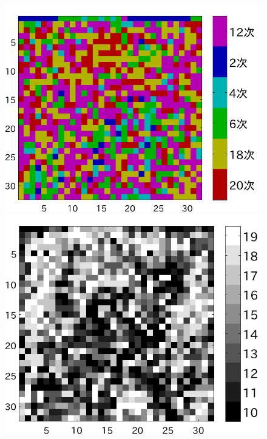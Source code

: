 \documentclass[25pt,landscape,dvipdfmx,uplatex]{foils}
\begin{document}
\begin{figure}[b]
\begin{flushleft}
\vspace{-1cm}
\includegraphics[angle=-90,scale=0.75]{fig/test1/l16/yosokusikino.pdf}
\includegraphics[angle=-90,scale=0.75]{fig/test1/l16/yosokusikihaba.pdf}

\end{flushleft}
\end{figure}
\end{document}
